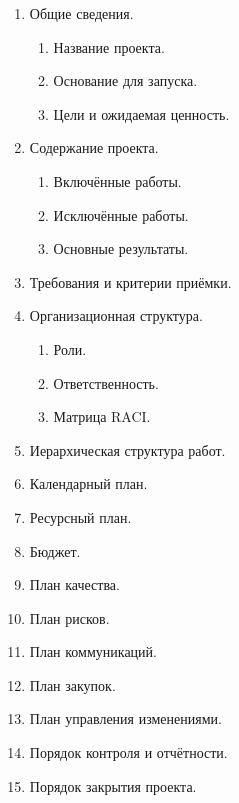 \documentclass[12pt,a4paper]{article}
\begin{document}
\begin{enumerate}
    \item Общие сведения.
    \begin{enumerate}
        \item Название проекта.
        \item Основание для запуска.
        \item Цели и ожидаемая ценность.
    \end{enumerate}

    \item Содержание проекта.
    \begin{enumerate}
        \item Включённые работы.
        \item Исключённые работы.
        \item Основные результаты.
    \end{enumerate}

    \item Требования и критерии приёмки.

    \item Организационная структура.
    \begin{enumerate}
        \item Роли.
        \item Ответственность.
        \item Матрица RACI.
    \end{enumerate}

    \item Иерархическая структура работ.

    \item Календарный план.

    \item Ресурсный план.

    \item Бюджет.

    \item План качества.

    \item План рисков.

    \item План коммуникаций.

    \item План закупок.

    \item План управления изменениями.

    \item Порядок контроля и отчётности.

    \item Порядок закрытия проекта.
\end{enumerate}
\end{document}
